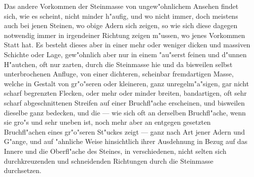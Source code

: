 \documentclass[a4paper, 11pt, oneside, german]{article}
\begin{document}
Das andere Vorkommen der Steinmasse von ungew"ohnlichem Ansehen findet sich, wie es scheint, nicht minder h"aufig, und wo nicht immer, doch meistens auch bei jenen Steinen, wo obige Adern sich zeigen, so wie sich diese dagegen notwendig immer in irgendeiner Richtung zeigen m"ussen, wo jenes Vorkommen Statt hat. Es besteht dieses aber in einer mehr oder weniger dicken und massiven Schichte oder Lage, gew"ohnlich aber nur in einem "au"serst feinen und d"unnen H"autchen, oft nur zarten, durch die Steinmasse hie und da bisweilen selbst unterbrochenen Anfluge, von einer dichteren, scheinbar fremdartigen Masse, welche in Gestalt von gr"o"seren oder kleineren, ganz unregelm"a"sigen, gar nicht scharf begrenzten Flecken, oder mehr oder minder breiten, bandartigen, oft sehr scharf abgeschnittenen Streifen auf einer Bruchfl"ache erscheinen, und bisweilen dieselbe ganz bedecken, und die --- wie sich oft an derselben Bruchfl"ache, wenn sie gro"s und sehr uneben ist, noch mehr aber an entgegen gesetzten Bruchfl"achen eines gr"o"seren St"uckes zeigt --- ganz nach Art jener Adern und G"ange, und auf "ahnliche Weise hinsichtlich ihrer Ausdehnung in Bezug auf das Innere und die Oberfl"ache des Steines, in verschiedenen, nicht selten sich durchkreuzenden und schneidenden Richtungen durch die Steinmasse durchsetzen.
\end{document}
